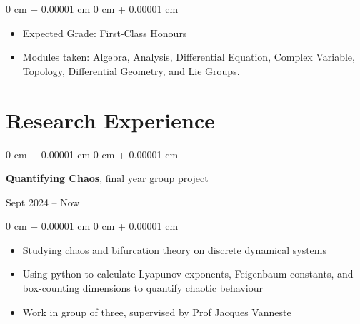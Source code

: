 \documentclass[10pt, a4paper]{article}
\newenvironment{highlights}{
    \begin{itemize}[
        topsep=0.10 cm,
        parsep=0.10 cm,
        partopsep=0pt,
        itemsep=0pt,
        leftmargin=0 cm + 10pt
    ]
}{
    \end{itemize}
} %
\newenvironment{onecolentry}{
    \begin{adjustwidth}{
        0 cm + 0.00001 cm
    }{
        0 cm + 0.00001 cm
    }
}{
    \end{adjustwidth}
} %
\newenvironment{twocolentry}[2][]{
    \onecolentry
    \def\secondColumn{#2}
    \setcolumnwidth{\fill, 4.5 cm}
    \begin{paracol}{2}
}{
    \switchcolumn \raggedleft \secondColumn
    \end{paracol}
    \endonecolentry
} %
\begin{document}
        \vspace{0.10 cm}
        \begin{onecolentry}
		\begin{highlights}
                \item Expected Grade: First-Class Honours
                \item Modules taken: Algebra, Analysis, Differential Equation, Complex Variable, Topology, Differential Geometry, and Lie Groups.
            \end{highlights}
        \end{onecolentry}

    

	\section{Research Experience}

		\begin{twocolentry}{
	            Sept 2024 – Now
	        }
				\textbf{Quantifying Chaos}, final year group project
			\end{twocolentry}
	        \vspace{0.10 cm}
	        \begin{onecolentry}
	            \begin{highlights}
	                \item Studying chaos and bifurcation theory on discrete dynamical systems
					\item Using python to calculate Lyapunov exponents, Feigenbaum constants, and box-counting dimensions to quantify chaotic behaviour
					\item Work in group of three, supervised by Prof Jacques Vanneste 
	            \end{highlights}
	        \end{onecolentry}

		\vspace{0.2 cm}
\end{document}
